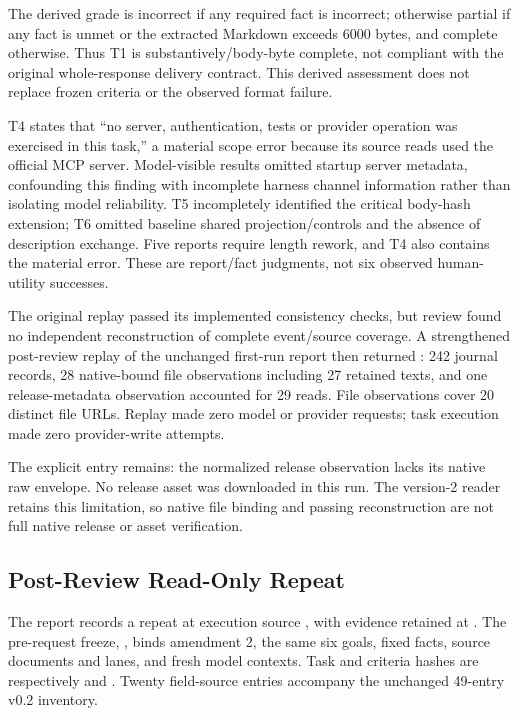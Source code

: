 \documentclass[11pt,letterpaper]{article}
\newcommand{\code}[1]{\texttt{\detokenize{#1}}}
\begin{document}
The derived grade is incorrect if any required fact is incorrect; otherwise
partial if any fact is unmet or the extracted Markdown exceeds 6000 bytes, and
complete otherwise. Thus T1 is substantively/body-byte complete, not compliant
with the original whole-response delivery contract. This derived assessment
does not replace frozen criteria or the observed format failure.

T4 states that ``no server, authentication, tests or provider operation was
exercised in this task,'' a material scope error because its source reads used
the official MCP server. Model-visible results omitted startup server metadata,
confounding this finding with incomplete harness channel information rather
than isolating model reliability. T5 incompletely identified the critical
body-hash extension; T6 omitted baseline shared projection/controls and the
absence of description exchange. Five reports require length rework, and T4
also contains the material error. These are report/fact judgments, not six
observed human-utility successes.

The original replay passed its implemented consistency checks, but review found
no independent reconstruction of complete event/source coverage. A strengthened
post-review replay of the unchanged first-run report then returned
\code{valid: true}: 242 journal records, 28 native-bound file observations
including 27 retained texts, and one release-metadata observation accounted for
29 reads. File observations cover 20 distinct file URLs. Replay made zero model
or provider requests; task execution made zero provider-write attempts.

The explicit \code{coverage_gaps} entry
 remains: the normalized release
observation lacks its native raw envelope. No release asset was downloaded in
this run. The version-2 reader retains this limitation, so native file binding
and passing reconstruction are not full native release or asset verification.

\subsection{Post-Review Read-Only Repeat}
\label{sec:field-repeat}

The report
 records a repeat
at execution source
\href{https://github.com/OndCo/Action-Effect-Bench/commit/dff6ba72e36842334fcc61d8d2c5f3545084898e}{\code{dff6ba7}},
with evidence retained at
\href{https://github.com/OndCo/Action-Effect-Bench/commit/7306d8b45402bb2ee7f9a1fbaf7203835e599110}{\code{7306d8b}}.
The pre-request freeze,
, binds
amendment 2, the same six goals, fixed facts, source documents and lanes, and
fresh model contexts. Task and criteria hashes are respectively
and .
Twenty field-source entries accompany the unchanged 49-entry v0.2 inventory.
\end{document}
